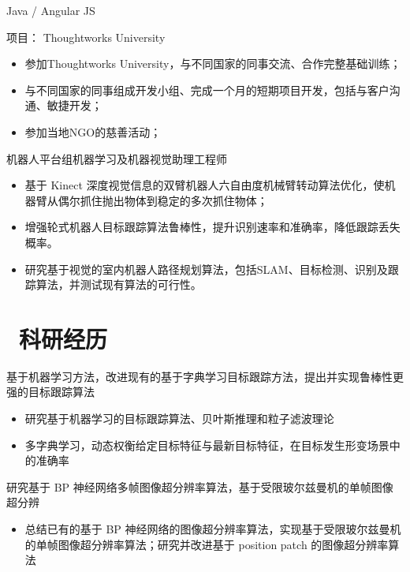 \documentclass{resume}
\begin{document}
Java / Angular JS

项目： Thoughtworks University
\begin{itemize}
  \item 参加Thoughtworks University，与不同国家的同事交流、合作完整基础训练；
  \item 与不同国家的同事组成开发小组、完成一个月的短期项目开发，包括与客户沟通、敏捷开发；
  \item 参加当地NGO的慈善活动；
\end{itemize}

机器人平台组机器学习及机器视觉助理工程师
\begin{itemize}
  \item 基于 Kinect 深度视觉信息的双臂机器人六自由度机械臂转动算法优化，使机器臂从偶尔抓住抛出物体到稳定的多次抓住物体；
  \item 增强轮式机器人目标跟踪算法鲁棒性，提升识别速率和准确率，降低跟踪丢失概率。
  \item 研究基于视觉的室内机器人路径规划算法，包括SLAM、目标检测、识别及跟踪算法，并测试现有算法的可行性。
\end{itemize}


\section{\faUsers\ 科研经历}

\begin{onehalfspacing}
基于机器学习方法，改进现有的基于字典学习目标跟踪方法，提出并实现鲁棒性更强的目标跟踪算法
\begin{itemize}
  \item 研究基于机器学习的目标跟踪算法、贝叶斯推理和粒子滤波理论
  \item 多字典学习，动态权衡给定目标特征与最新目标特征，在目标发生形变场景中的准确率
\end{itemize}
\end{onehalfspacing}

\begin{onehalfspacing}
研究基于 BP 神经网络多帧图像超分辨率算法，基于受限玻尔兹曼机的单帧图像超分辨
\begin{itemize}
  \item 总结已有的基于 BP 神经网络的图像超分辨率算法，实现基于受限玻尔兹曼机的单帧图像超分辨率算法；研究并改进基于 position patch 的图像超分辨率算法
\end{itemize}
\end{onehalfspacing}
\end{document}
